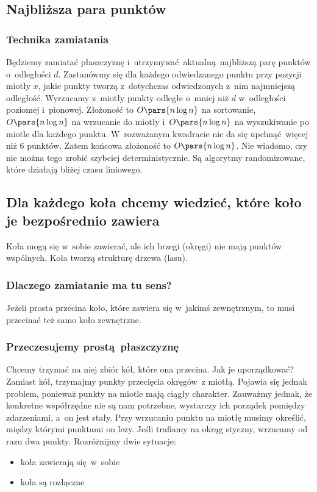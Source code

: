 \subsection*{Najbliższa para punktów}
\subsubsection*{Technika zamiatania}
Będziemy zamiatać płaszczyznę i~utrzymywać aktualną najbliższą parę punktów o~odległości \(d\). Zastanówmy się dla każdego odwiedzanego punktu przy pozycji miotły \(x\), jakie punkty tworzą z~dotychczas odwiedzonych z~nim najmniejszą odległość. Wyrzucamy z~miotły punkty odległe o~mniej niż \(d\) w~odległości poziomej i~pionowej. Złożoność to \(O\pars{n \log n}\) na sortowanie, \(O\pars{n \log n}\) na wrzucanie do miotły i~\(O\pars{n \log n}\) na wyszukiwanie po miotle dla każdego punktu. W~rozważanym kwadracie nie da się upchnąć więcej niż \(6\) punktów. Zatem końcowa złożoność to \(O\pars{n \log n}\). Nie wiadomo, czy nie można tego zrobić szybciej deterministycznie. Są algorytmy randomizowane, które działają bliżej czasu liniowego.
\subsection*{Dla każdego koła chcemy wiedzieć, które koło je bezpośrednio zawiera}
Koła mogą się w~sobie zawierać, ale ich brzegi (okręgi) nie mają punktów wspólnych. Koła tworzą strukturę drzewa (lasu).
\subsubsection*{Dlaczego zamiatanie ma tu sens?}
Jeżeli prosta przecina koło, które zawiera się w~jakimś zewnętrznym, to musi przecinać też samo koło zewnętrzne.
\subsubsection*{Przeczesujemy prostą płaszczyznę}
Chcemy trzymać na niej zbiór kół, które ona przecina. Jak je uporządkować? Zamiast kół, trzymajmy punkty przecięcia okręgów~z miotłą. Pojawia się jednak problem, ponieważ punkty na miotle mają ciągły charakter. Zauważmy jednak, że konkretne współrzędne nie są nam potrzebne, wystarczy ich porządek pomiędzy zdarzeniami, a~on jest stały. Przy wrzucaniu punktu na miotłę musimy określić, między którymi punktami on leży. Jeśli trafiamy na okrąg styczny, wrzucamy od razu dwa punkty. Rozróżnijmy dwie sytuacje:
\begin{itemize}
    \item koła zawierają się w~sobie
    \item koła są rozłączne
\end{itemize}
